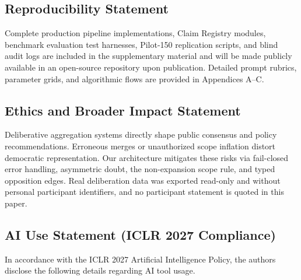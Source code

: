 \documentclass{article}
\begin{document}
\subsection*{Reproducibility Statement}

Complete production pipeline implementations, Claim Registry modules, benchmark evaluation test harnesses, Pilot-150 replication scripts, and blind audit logs are included in the supplementary material and will be made publicly available in an open-source repository upon publication. Detailed prompt rubrics, parameter grids, and algorithmic flows are provided in Appendices A--C.

\subsection*{Ethics and Broader Impact Statement}

Deliberative aggregation systems directly shape public consensus and policy recommendations. Erroneous merges or unauthorized scope inflation distort democratic representation. Our architecture mitigates these risks via fail-closed error handling, asymmetric doubt, the non-expansion scope rule, and typed opposition edges. Real deliberation data was exported read-only and without personal participant identifiers, and no participant statement is quoted in this paper.

\subsection*{AI Use Statement (ICLR 2027 Compliance)}

In accordance with the ICLR 2027 Artificial Intelligence Policy, the authors disclose the following details regarding AI tool usage.
\end{document}
